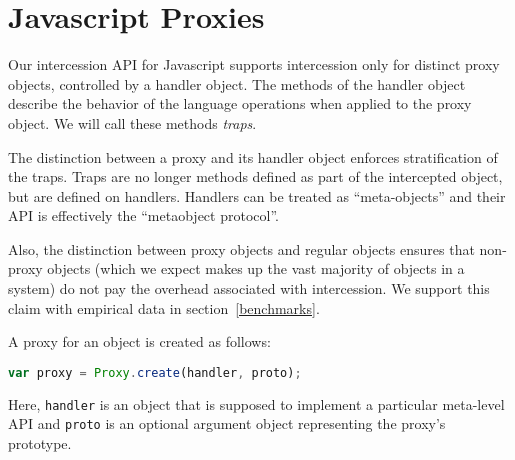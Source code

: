 \documentclass{acm_proc_article-sp}
\begin{document}
\section{Javascript Proxies}
\label{sec:proxies_for_javascript}

Our intercession API for Javascript supports intercession only for distinct proxy objects, controlled by a handler object. The methods of the handler object describe the behavior of the language operations when applied to the proxy object. We will call these methods \emph{traps}.

The distinction between a proxy and its handler object enforces stratification of the traps. Traps are no longer methods defined as part of the intercepted object, but are defined on handlers. Handlers can be treated as ``meta-objects'' and their API is effectively the ``metaobject protocol''.

Also, the distinction between proxy objects and regular objects ensures that non-proxy objects (which we expect makes up the vast majority of objects in a system) do not pay the overhead associated with intercession. We support this claim with empirical data in section~\ref{benchmarks}.

A proxy for an object is created as follows:

\begin{lstlisting}[language=javascript]
var proxy = Proxy.create(handler, proto);
\end{lstlisting}

Here, \texttt{handler} is an object that is supposed to implement a particular meta-level API and \texttt{proto} is an optional argument object representing the proxy's prototype.
\end{document}
